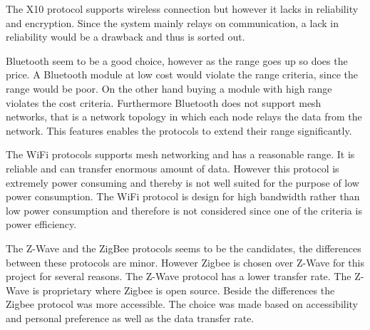 The X10 protocol supports wireless connection but however it lacks in reliability and encryption. Since the system mainly relays on communication, a lack in reliability would be a drawback and thus is sorted out.


Bluetooth seem to be a good choice, however as the range goes up so does the price. A Bluetooth module at low cost would violate the range criteria, since the range would be poor. On the other hand buying a module with high range violates the cost criteria. Furthermore Bluetooth does not support mesh networks, that is a network topology in which each node relays the data from the network. This features enables the protocols to extend their range significantly. 


The WiFi protocols supports mesh networking and has a reasonable range. It is reliable and can transfer enormous amount of data. However this protocol is extremely power consuming and thereby is not well suited for the purpose of low power consumption. The WiFi protocol is design for high bandwidth rather than low power consumption and therefore is not considered since one of the criteria is power efficiency.  


The Z-Wave and the ZigBee protocols seems to be the candidates, the differences between these protocols are minor. However Zigbee is chosen over Z-Wave for this project for several reasons. The Z-Wave protocol has a lower transfer rate. The Z-Wave is proprietary where Zigbee is open source. Beside the differences the Zigbee protocol was more accessible. The choice was made based on accessibility and personal preference as well as the data transfer rate.
